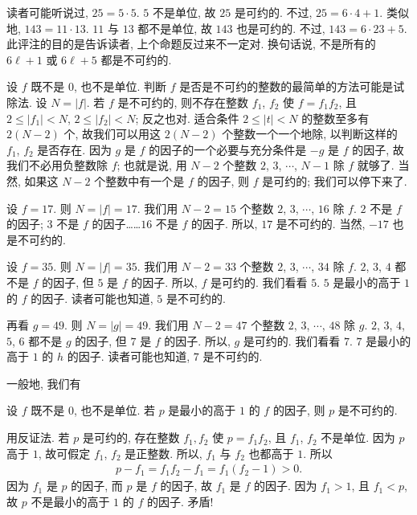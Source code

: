 \begin{remark}
    读者可能听说过, $25 = 5 \cdot 5$. $5$ 不是单位, 故 $25$ 是可约的. 不过, $25 = 6 \cdot 4 + 1$. 类似地, $143 = 11 \cdot 13$. $11$ 与 $13$ 都不是单位, 故 $143$ 也是可约的. 不过, $143 = 6 \cdot 23 + 5$. 此评注的目的是告诉读者, 上个命题反过来不一定对. 换句话说, 不是所有的 $6\ell + 1$ 或 $6\ell + 5$ 都是不可约的.
\end{remark}

设 $f$ 既不是 $0$, 也不是单位. 判断 $f$ 是否是不可约的整数的最简单的方法可能是试除法. 设 $N = |f|$. 若 $f$ 是不可约的, 则不存在整数 $f_1$, $f_2$ 使 $f = f_1 f_2$, 且 $2 \leq |f_1| < N$, $2 \leq |f_2| < N$; 反之也对. 适合条件 $2 \leq |t| < N$ 的整数至多有 $2(N-2)$ 个, 故我们可以用这 $2(N-2)$ 个整数一个一个地除, 以判断这样的 $f_1$, $f_2$ 是否存在. 因为 $g$ 是 $f$ 的因子的一个必要与充分条件是 $-g$ 是 $f$ 的因子, 故我们不必用负整数除 $f$; 也就是说, 用 $N-2$ 个整数 $2$, $3$, $\cdots$, $N-1$ 除 $f$ 就够了. 当然, 如果这 $N-2$ 个整数中有一个是 $f$ 的因子, 则 $f$ 是可约的; 我们可以停下来了.

\begin{example}
    设 $f = 17$. 则 $N = |f| = 17$. 我们用 $N-2=15$ 个整数 $2$, $3$, $\cdots$, $16$ 除 $f$. $2$ 不是 $f$ 的因子; $3$ 不是 $f$ 的因子……$16$ 不是 $f$ 的因子. 所以, $17$ 是不可约的. 当然, $-17$ 也是不可约的.
\end{example}

\begin{example}
    设 $f = 35$. 则 $N = |f| = 35$. 我们用 $N-2=33$ 个整数 $2$, $3$, $\cdots$, $34$ 除 $f$. $2$, $3$, $4$ 都不是 $f$ 的因子, 但 $5$ 是 $f$ 的因子. 所以, $f$ 是可约的. 我们看看 $5$. $5$ 是最小的高于 $1$ 的 $f$ 的因子. 读者可能也知道, $5$ 是不可约的.

    再看 $g = 49$. 则 $N = |g| = 49$. 我们用 $N-2=47$ 个整数 $2$, $3$, $\cdots$, $48$ 除 $g$. $2$, $3$, $4$, $5$, $6$ 都不是 $g$ 的因子, 但 $7$ 是 $f$ 的因子. 所以, $g$ 是可约的. 我们看看 $7$. $7$ 是最小的高于 $1$ 的 $h$ 的因子. 读者可能也知道, $7$ 是不可约的.
\end{example}

一般地, 我们有
\begin{proposition}
    设 $f$ 既不是 $0$, 也不是单位. 若 $p$ 是最小的高于 $1$ 的 $f$ 的因子, 则 $p$ 是不可约的.
\end{proposition}

\begin{pf}
    用反证法. 若 $p$ 是可约的, 存在整数 $f_1, f_2$ 使 $p = f_1 f_2$, 且 $f_1$, $f_2$ 不是单位. 因为 $p$ 高于 $1$, 故可假定 $f_1$, $f_2$ 是正整数. 所以, $f_1$ 与 $f_2$ 也都高于 $1$. 所以
    \begin{align*}
        p - f_1 = f_1 f_2 - f_1 = f_1 (f_2 - 1) > 0.
    \end{align*}
    因为 $f_1$ 是 $p$ 的因子, 而 $p$ 是 $f$ 的因子, 故 $f_1$ 是 $f$ 的因子. 因为 $f_1 > 1$, 且 $f_1 < p$, 故 $p$ 不是最小的高于 $1$ 的 $f$ 的因子. 矛盾!
\end{pf}

